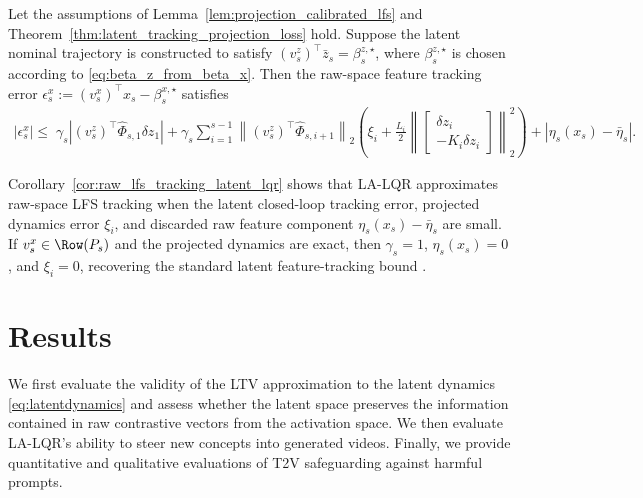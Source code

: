 \documentclass{article}
\begin{document}
\begin{corollary}
\label{cor:raw_lfs_tracking_latent_lqr}
Let the assumptions of Lemma~\ref{lem:projection_calibrated_lfs} and
Theorem~\ref{thm:latent_tracking_projection_loss} hold. Suppose the
latent nominal trajectory is constructed to satisfy
$(v^z_s)^\top \bar z_s = \beta^{z,\star}_s$, 
where $\beta^{z,\star}_s$ is chosen according to
\eqref{eq:beta_z_from_beta_x}. Then the raw-space feature tracking
error $\epsilon^x_s
    :=
    (v^x_s)^\top x_s-\beta^{x,\star}_s$
satisfies
\[
\begin{aligned}
    |\epsilon^x_s|
    \le\;
    \gamma_s
    \left|
    (v^z_s)^\top \widehat\Phi_{s,1}\delta z_1
    \right|
    +
    \gamma_s
    \sum_{i=1}^{s-1}
    \left\|
    (v^z_s)^\top \widehat\Phi_{s,i+1}
    \right\|_2
    \left(
    \xi_i
    +
    \frac{L_i}{2}
    \left\|
    \begin{bmatrix}
    \delta z_i\\
    -K_i\delta z_i
    \end{bmatrix}
    \right\|_2^2
    \right)
    +
    \left|
    \eta_s(x_s)-\bar\eta_s
    \right|.
\end{aligned}
\label{eq:raw_lfs_tracking_bound}
\]
\end{corollary}

Corollary~\ref{cor:raw_lfs_tracking_latent_lqr} shows that LA-LQR approximates raw-space LFS tracking when the latent closed-loop
tracking error, projected dynamics error $\xi_i$, and discarded raw
feature component $\eta_s(x_s)-\bar\eta_s$ are small. If
$v^x_s\in\Row(P_s)$ and the projected dynamics are exact, then
$\gamma_s=1$, $\eta_s(x_s)=0$, and $\xi_i=0$, recovering the standard
latent feature-tracking bound \cite[Eq. 23]{skifstad2026local}.

\section{Results}\label{sec:results}
\vspace{-7pt}

We first evaluate the validity of the LTV approximation to the latent dynamics \eqref{eq:latentdynamics} and assess whether the latent space preserves the information contained in raw contrastive vectors from the activation space. We then evaluate LA-LQR's ability to steer new concepts into generated videos. Finally, we provide quantitative and qualitative evaluations of T2V safeguarding against harmful prompts.
\end{document}
